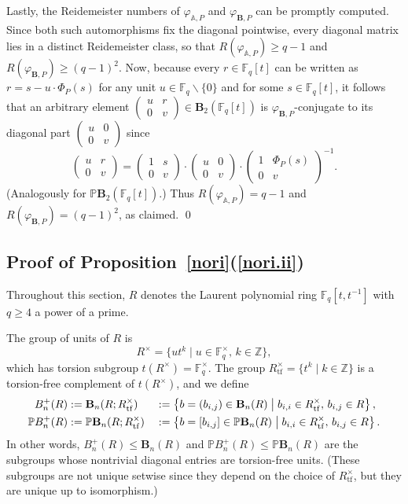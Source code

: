 \documentclass[a4paper,11pt]{amsart}
\numberwithin{equation}{section}
\theoremstyle{plain}
\theoremstyle{definition}
\newcommand{\Z}{\mathbb{Z}}
\newcommand{\F}{\mathbb{F}}
\newcommand{\mbB}{\mathbf{B}} %
\newcommand{\PB}{\mathbb{P}\mathbf{B}} %
\newcommand{\PBplus}{\mathbb{P}B^{+}} %
\newcommand{\phee}{\varphi} %
\newcommand{\dref}[2]{\ref{#1}{\bf(\ref{#2})}} %
\begin{document}
Lastly, the Reidemeister numbers of $\phee_{\mathbb{A},P}$ and $\phee_{\mbB,P}$ can be promptly computed. Since both such automorphisms fix the diagonal pointwise, every diagonal matrix lies in a distinct Reidemeister class, so that $R(\phee_{\mathbb{A},P}) \geq q-1$ and $R(\phee_{\mbB,P}) \geq (q-1)^2$. Now, because every $r \in \F_q[t]$ can be written as $r = s - u \cdot \Phi_P(s)$ for any unit $u \in \F_q \backslash \{0\}$ and for some $s \in \F_q[t]$, it follows that an arbitrary element $\left( \begin{smallmatrix} u & r \\ 0 & v\end{smallmatrix} \right) \in \mbB_2(\F_q[t])$ is $\phee_{\mbB,P}$-conjugate to its diagonal part $\left( \begin{smallmatrix} u & 0 \\ 0 & v\end{smallmatrix} \right)$ since
\[ \begin{pmatrix} u & r \\ 0 & v \end{pmatrix} = \begin{pmatrix} 1 & s \\ 0 & v \end{pmatrix} \cdot \begin{pmatrix} u & 0 \\ 0 & v \end{pmatrix} \cdot \begin{pmatrix} 1 & \Phi_P(s) \\ 0 & v \end{pmatrix}^{-1}.\] 
(Analogously for $ \PB_2(\F_q[t])$.) Thus $R(\phee_{\mathbb{A},P}) = q-1$ and $R(\phee_{\mbB,P}) = (q-1)^2$, as claimed. \qed


\subsection{Proof of Proposition~\dref{nori}{nori.ii}} \label{fqttmo}
Throughout this section, $R$ denotes the Laurent polynomial ring $\F_q[t,t^{-1}]$ with $q\geq 4$ a power of a prime. 

The group of units of $R$ is 
\[R^{\times}=\{u t^k \mid u \in \F_q^\times, \, k \in \Z\},\] 
which has torsion subgroup $t(R^\times)=\F_{q}^{\times}$. The group $R^\times_{\mathrm{tf}}=\{t^k\mid k \in \Z\}$ is a torsion-free complement of $t(R^\times)$, and we define 
\begin{alignat*}{3} B_{n}^{+}(R)&:= \mbB_n(R ; R^\times_{\mathrm{tf}}) &&:= \left\{ b=(b_{i,j}) \in \mbB_n(R) \bigm| b_{i,i} \in R^\times_{\mathrm{tf}},\, b_{i,j} \in R \right\},\\	
\PBplus_n(R) &:= \PB_n(R ; R^\times_{\mathrm{tf}}) &&:= \left\{ b=[b_{i,j}] \in \PB_n(R) \bigm| b_{i,i} \in R^\times_{\mathrm{tf}},\, b_{i,j} \in R \right\}.
\end{alignat*}
In other words, $B_n^+(R)\leq \mbB_n(R)$ and $\PBplus_n(R) \leq \PB_n(R)$ are the subgroups whose nontrivial diagonal entries are torsion-free units. (These subgroups are not unique setwise since they depend on the choice of $R^\times_{\mathrm{tf}}$, but they are unique up to isomorphism.) 
\end{document}

